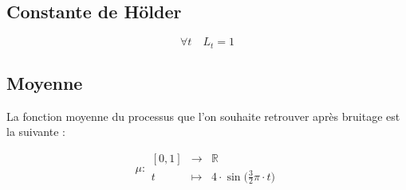 \subsection{Constante de Hölder
}

$$\forall t \quad L_t = 1$$


\subsection{Moyenne}


\begin{minipage}{0.47\linewidth}

	La fonction moyenne du processus que l'on souhaite retrouver après bruitage est la suivante :

	$$
		\mu : \begin{array}{ccc}
			[0,1] & \longrightarrow & \mathbb R
			\\
			t     & \longmapsto     & 4 \cdot \sin\bigl( \frac 3 2 \pi \cdot t \bigr)
		\end{array}
	$$
\end{minipage}
\hfill
\begin{minipage}{0.47\linewidth}
	\begin{figure}[H]
		\centering
		\label{plot:mu}
	\end{figure}
\end{minipage}







